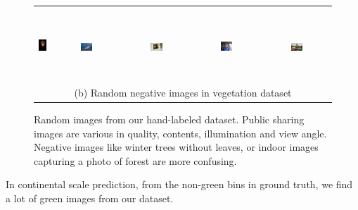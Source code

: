 \begin{figure}[th]
{{\begin{center}
\begin{tabular}{@{}c@{\,\,\,}c@{\,\,\,}c@{\,\,\,}c@{\,\,\,}c@{\,\,\,}}
\\[-6pt]
\hline
\\[-6pt]
\includegraphics[height=1in]{imggrid/datasetnega/6.jpg} &
\includegraphics[width=0.19\textwidth]{imggrid/datasetnega/7.jpg} &
\includegraphics[width=0.19\textwidth]{imggrid/datasetnega/8.jpg} &
\includegraphics[width=0.19\textwidth]{imggrid/datasetnega/9.jpg} &
\includegraphics[width=0.19\textwidth]{imggrid/datasetnega/10.jpg} \\
\multicolumn{5}{c}{(b) Random negative images in vegetation dataset} \\
\end{tabular}
\end{center}
}}
\caption{Random images from our hand-labeled dataset. Public sharing images are various in quality, contents, illumination and view angle.
Negative images like winter trees without leaves, or indoor images capturing a photo of forest are more confusing.}
\label{fig:dataset}
\end{figure}


In continental scale prediction, from the non-green bins in ground truth, we find a lot of 
green images from our dataset.

